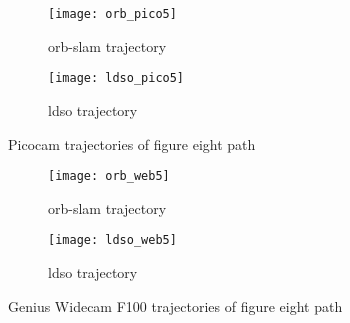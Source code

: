 \begin{figure}[H]
	\begin{subfigure}{.5\textwidth}
		\centering
		\texttt{[image: orb\_pico5]}
		\caption{\acrshort{orb}-\acrshort{slam} trajectory}
		\label{fig:orb_pico5}
	\end{subfigure}
	\begin{subfigure}{.5\textwidth}
		\centering
		\texttt{[image: ldso\_pico5]}
		\caption{\acrshort{ldso} trajectory}
		\label{fig:ldso_pico5}
	\end{subfigure}
	\caption{Picocam trajectories of figure eight path}
	\label{fig:Pico5}
\end{figure}
\begin{figure}[H]
	\begin{subfigure}{.5\textwidth}
		\centering
		\texttt{[image: orb\_web5]}
		\caption{\acrshort{orb}-\acrshort{slam} trajectory}
		\label{fig:orb_web5}
	\end{subfigure}%
	\begin{subfigure}{.5\textwidth}
		\centering
		\texttt{[image: ldso\_web5]}
		\caption{\acrshort{ldso} trajectory}
		\label{fig:ldso_web5}
	\end{subfigure}
	\caption{Genius Widecam F100 trajectories of figure eight path}
	\label{fig:Web5}
\end{figure}

